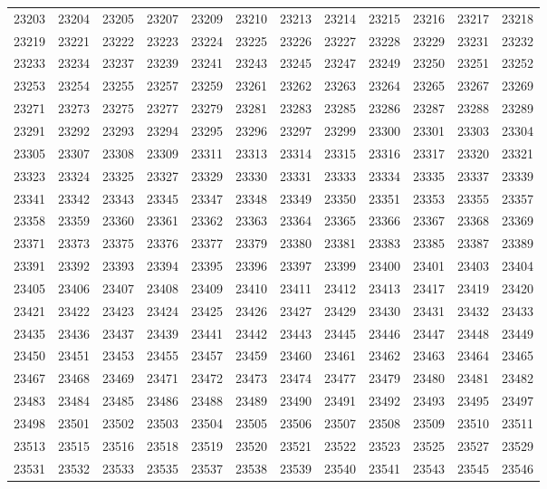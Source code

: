 \begin{center}
\begin{longtable}{llllllllllll}
23203 &23204 &23205 &23207 &23209 &23210 &23213 &23214 &23215 &23216 &23217 &23218 \\
23219 &23221 &23222 &23223 &23224 &23225 &23226 &23227 &23228 &23229 &23231 &23232 \\
23233 &23234 &23237 &23239 &23241 &23243 &23245 &23247 &23249 &23250 &23251 &23252 \\
23253 &23254 &23255 &23257 &23259 &23261 &23262 &23263 &23264 &23265 &23267 &23269 \\
23271 &23273 &23275 &23277 &23279 &23281 &23283 &23285 &23286 &23287 &23288 &23289 \\
23291 &23292 &23293 &23294 &23295 &23296 &23297 &23299 &23300 &23301 &23303 &23304 \\
23305 &23307 &23308 &23309 &23311 &23313 &23314 &23315 &23316 &23317 &23320 &23321 \\
23323 &23324 &23325 &23327 &23329 &23330 &23331 &23333 &23334 &23335 &23337 &23339 \\
23341 &23342 &23343 &23345 &23347 &23348 &23349 &23350 &23351 &23353 &23355 &23357 \\
23358 &23359 &23360 &23361 &23362 &23363 &23364 &23365 &23366 &23367 &23368 &23369 \\
23371 &23373 &23375 &23376 &23377 &23379 &23380 &23381 &23383 &23385 &23387 &23389 \\
23391 &23392 &23393 &23394 &23395 &23396 &23397 &23399 &23400 &23401 &23403 &23404 \\
23405 &23406 &23407 &23408 &23409 &23410 &23411 &23412 &23413 &23417 &23419 &23420 \\
23421 &23422 &23423 &23424 &23425 &23426 &23427 &23429 &23430 &23431 &23432 &23433 \\
23435 &23436 &23437 &23439 &23441 &23442 &23443 &23445 &23446 &23447 &23448 &23449 \\
23450 &23451 &23453 &23455 &23457 &23459 &23460 &23461 &23462 &23463 &23464 &23465 \\
23467 &23468 &23469 &23471 &23472 &23473 &23474 &23477 &23479 &23480 &23481 &23482 \\
23483 &23484 &23485 &23486 &23488 &23489 &23490 &23491 &23492 &23493 &23495 &23497 \\
23498 &23501 &23502 &23503 &23504 &23505 &23506 &23507 &23508 &23509 &23510 &23511 \\
23513 &23515 &23516 &23518 &23519 &23520 &23521 &23522 &23523 &23525 &23527 &23529 \\
23531 &23532 &23533 &23535 &23537 &23538 &23539 &23540 &23541 &23543 &23545 &23546 \\

\end{longtable}
\end{center}
